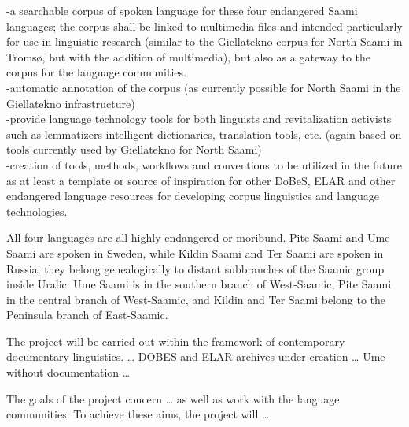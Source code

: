 \documentclass[a4paper,12pt]{article}
\begin{document}
-a searchable corpus of spoken language for these four endangered Saami languages; the corpus shall be linked to multimedia files and intended particularly for use in linguistic research (similar to the Giellatekno corpus for North Saami in Tromsø, but with the addition of multimedia), but also as a gateway to the corpus for the language communities.\\
-automatic annotation of the corpus (as currently possible for North Saami in the Giellatekno infrastructure)\\
-provide language technology tools for both linguists and revitalization activists such as lemmatizers %
intelligent dictionaries, translation tools, etc. (again based on tools currently used by Giellatekno for North Saami)\\
-creation of tools, methods, workflows and conventions to be utilized in the future as at least a template or source of inspiration for other DoBeS, ELAR and other endangered language resources for developing corpus linguistics and language technologies.


All four languages are all highly endangered or moribund. Pite Saami and Ume Saami are spoken in Sweden, while Kildin Saami and Ter Saami are spoken in Russia; they belong genealogically to distant subbranches of the Saamic group inside Uralic: Ume Saami is in the southern branch of West-Saamic, Pite Saami in the central branch of West-Saamic, and Kildin and Ter Saami belong to the Peninsula branch of East-Saamic.

The project will be carried out within the framework of contemporary documentary linguistics. 
 … DOBES and ELAR archives under creation … Ume without documentation …

The goals of the project concern … as well as work with the language communities. To achieve these aims, the project will …
\end{document}
